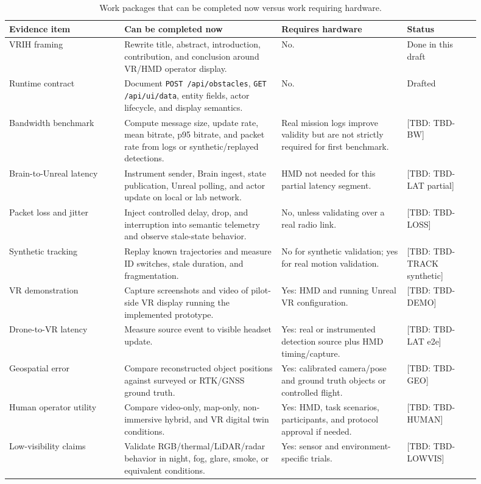 \documentclass[11pt,a4paper]{article}
\newcommand{\tbd}[1]{\textcolor{publicationred}{[TBD: #1]}}
\newcommand{\code}[1]{\texttt{#1}}
\begin{document}
\begin{table}[H]
\centering
\small
\caption{Work packages that can be completed now versus work requiring hardware.}
\label{tab:readiness}
\begin{tabular}{@{}L{0.22\linewidth}L{0.30\linewidth}L{0.24\linewidth}L{0.14\linewidth}@{}}
\toprule
Evidence item & Can be completed now & Requires hardware & Status \\
\midrule
VRIH framing & Rewrite title, abstract, introduction, contribution, and conclusion around VR/HMD operator display. & No. & Done in this draft \\
Runtime contract & Document \code{POST /api/obstacles}, \code{GET /api/ui/data}, entity fields, actor lifecycle, and display semantics. & No. & Drafted \\
Bandwidth benchmark & Compute message size, update rate, mean bitrate, p95 bitrate, and packet rate from logs or synthetic/replayed detections. & Real mission logs improve validity but are not strictly required for first benchmark. & \tbd{TBD-BW} \\
Brain-to-Unreal latency & Instrument sender, Brain ingest, state publication, Unreal polling, and actor update on local or lab network. & HMD not needed for this partial latency segment. & \tbd{TBD-LAT partial} \\
Packet loss and jitter & Inject controlled delay, drop, and interruption into semantic telemetry and observe stale-state behavior. & No, unless validating over a real radio link. & \tbd{TBD-LOSS} \\
Synthetic tracking & Replay known trajectories and measure ID switches, stale duration, and fragmentation. & No for synthetic validation; yes for real motion validation. & \tbd{TBD-TRACK synthetic} \\
VR demonstration & Capture screenshots and video of pilot-side VR display running the implemented prototype. & Yes: HMD and running Unreal VR configuration. & \tbd{TBD-DEMO} \\
Drone-to-VR latency & Measure source event to visible headset update. & Yes: real or instrumented detection source plus HMD timing/capture. & \tbd{TBD-LAT e2e} \\
Geospatial error & Compare reconstructed object positions against surveyed or RTK/GNSS ground truth. & Yes: calibrated camera/pose and ground truth objects or controlled flight. & \tbd{TBD-GEO} \\
Human operator utility & Compare video-only, map-only, non-immersive hybrid, and VR digital twin conditions. & Yes: HMD, task scenarios, participants, and protocol approval if needed. & \tbd{TBD-HUMAN} \\
Low-visibility claims & Validate RGB/thermal/LiDAR/radar behavior in night, fog, glare, smoke, or equivalent conditions. & Yes: sensor and environment-specific trials. & \tbd{TBD-LOWVIS} \\
\bottomrule
\end{tabular}
\normalsize
\end{table}
\end{document}
